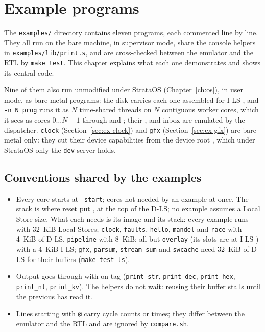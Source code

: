 \chapter{Example programs}\label{ch:examples}

The \texttt{examples/} directory contains eleven programs, each commented line by line. They all run on
the bare machine, in supervisor mode, share the console helpers in \texttt{examples/lib/print.s}, and are
cross-checked between the emulator and the RTL by \texttt{make test}. This chapter explains what each one
demonstrates and shows its central code.

Nine of them also run unmodified under StrataOS (Chapter~\ref{ch:os}), in user mode, as bare-metal
programs: the disk carries each one assembled for I-LS , and \texttt{-n N prog} runs it as $N$
time-shared threads on $N$ contiguous worker cores, which it sees as cores $0 \ldots N-1$ through
 and ; their ,  and inbox  are emulated
by the dispatcher. \texttt{clock} (Section~\ref{sec:ex-clock}) and \texttt{gfx}
(Section~\ref{sec:ex-gfx}) are bare-metal only: they cut their device capabilities from the device
root , which under StrataOS only the \texttt{dev} server holds.

\section{Conventions shared by the examples}
\begin{itemize}
\item Every core starts at \texttt{\_start}; cores not needed by an example  at once. The
  stack is where reset put , at the top of the D-LS; no example assumes a Local Store size.
  What each needs is its image and its stack: every example runs with 32~KiB Local Stores;
  \texttt{clock}, \texttt{faults}, \texttt{hello}, \texttt{mandel} and \texttt{race} with 4~KiB of D-LS,
  \texttt{pipeline} with 8~KiB; all but \texttt{overlay} (its slots are at I-LS ) with a 4~KiB
  I-LS; \texttt{gfx}, \texttt{parsum}, \texttt{stream\_sum} and \texttt{swcache} need 32~KiB of D-LS for
  their buffers (\texttt{make test-ls}).
\item Output goes through  with  on tag  (\texttt{print\_str},
  \texttt{print\_dec}, \texttt{print\_hex}, \texttt{print\_nl}, \texttt{print\_kv}). The helpers do not
  wait: reusing their buffer stalls until the previous  has read it.
\item Lines starting with \texttt{@} carry cycle counts or times; they differ between the emulator and the RTL and
  are ignored by \texttt{compare.sh}.
\end{itemize}

